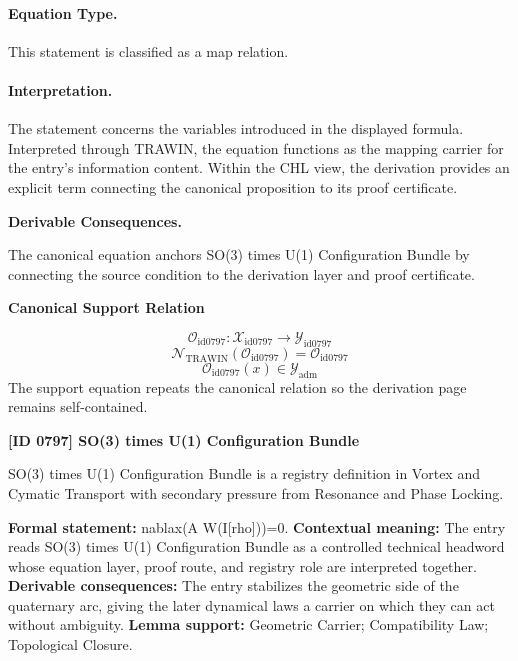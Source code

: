 \paragraph{Equation Type.}
This statement is classified as a map relation.

\paragraph{Interpretation.}
The statement concerns the variables introduced in the displayed formula. Interpreted through TRAWIN, the equation functions as the mapping carrier for the entry’s information content. Within the CHL view, the derivation provides an explicit term connecting the canonical proposition to its proof certificate.

\par\vspace{0.35em}
\noindent\textbf{Derivable Consequences.}\quad
\begingroup
\footnotesize
\raggedright
The canonical equation anchors SO(3) times U(1) Configuration Bundle by connecting the source condition to the derivation layer and proof certificate.
\par\endgroup

\noindent\textbf{Canonical Support Relation}\par
\[
\mathcal{O}_{\mathrm{id0797}}:\mathcal{X}_{\mathrm{id0797}}\longrightarrow\mathcal{Y}_{\mathrm{id0797}}
\]
\[
\mathcal{N}_{\mathrm{TRAWIN}}(\mathcal{O}_{\mathrm{id0797}})=\mathcal{O}_{\mathrm{id0797}}
\]
\[
\mathcal{O}_{\mathrm{id0797}}(x)\in\mathcal{Y}_{\mathrm{adm}}
\]
\noindent The support equation repeats the canonical relation so the derivation page remains self-contained.\par

\clearpage
\noindent\textbf{[ID 0797] SO(3) times U(1) Configuration Bundle}\par
\vspace{0.35em}
\begingroup\small
{}
SO(3) times U(1) Configuration Bundle is a registry definition in Vortex and Cymatic Transport with secondary pressure from Resonance and Phase Locking.

\begingroup\footnotesize\setlength{\emergencystretch}{3em}\sloppy
\textbf{Formal statement:} nablax(A W(I[rho]))=0. \textbf{Contextual meaning:} The entry reads SO(3) times U(1) Configuration Bundle as a controlled technical headword whose equation layer, proof route, and registry role are interpreted together. \textbf{Derivable consequences:} The entry stabilizes the geometric side of the quaternary arc, giving the later dynamical laws a carrier on which they can act without ambiguity. \textbf{Lemma support:} Geometric Carrier; Compatibility Law; Topological Closure.\par
\endgroup

